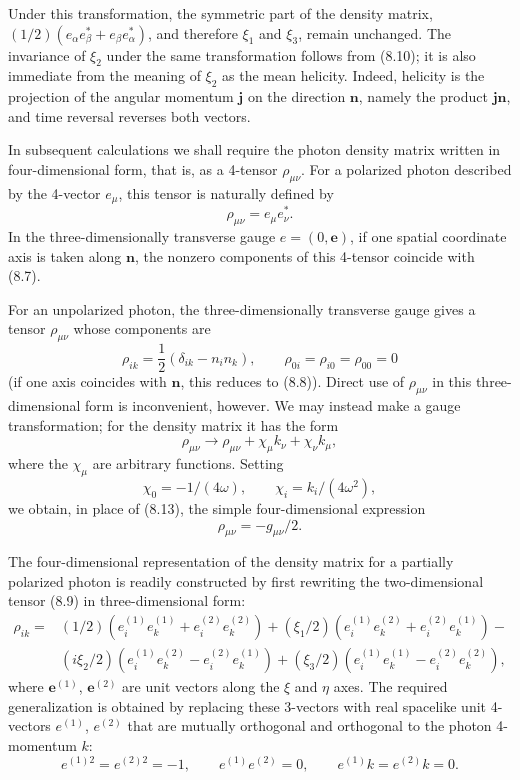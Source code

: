 Under this transformation, the symmetric part of the density matrix, $(1/2)(e_\alpha e^*_\beta+e_\beta e^*_\alpha)$, and therefore $\xi_1$ and $\xi_3$, remain unchanged. The invariance of $\xi_2$ under the same transformation follows from (8.10); it is also immediate from the meaning of $\xi_2$ as the mean helicity. Indeed, helicity is the projection of the angular momentum $\mathbf{j}$ on the direction $\mathbf{n}$, namely the product $\mathbf{j}\mathbf{n}$, and time reversal reverses both vectors.

In subsequent calculations we shall require the photon density matrix written in four-dimensional form, that is, as a 4-tensor $\rho_{\mu\nu}$. For a polarized photon described by the 4-vector $e_\mu$, this tensor is naturally defined by
\begin{equation}
\rho_{\mu\nu}=e_\mu e^*_\nu.
\tag{8.12}
\end{equation}
In the three-dimensionally transverse gauge $e=(0,\mathbf{e})$, if one spatial coordinate axis is taken along $\mathbf{n}$, the nonzero components of this 4-tensor coincide with (8.7).

For an unpolarized photon, the three-dimensionally transverse gauge gives a tensor $\rho_{\mu\nu}$ whose components are
\begin{equation}
\rho_{ik}=\frac{1}{2}(\delta_{ik}-n_i n_k),
\qquad
\rho_{0i}=\rho_{i0}=\rho_{00}=0
\tag{8.13}
\end{equation}
(if one axis coincides with $\mathbf{n}$, this reduces to (8.8)). Direct use of $\rho_{\mu\nu}$ in this three-dimensional form is inconvenient, however. We may instead make a gauge transformation; for the density matrix it has the form
\begin{equation}
\rho_{\mu\nu}\to\rho_{\mu\nu}+\chi_\mu k_\nu+\chi_\nu k_\mu,
\tag{8.14}
\end{equation}
where the $\chi_\mu$ are arbitrary functions. Setting
\[
\chi_0=-1/(4\omega),
\qquad
\chi_i=k_i/(4\omega^2),
\]
we obtain, in place of (8.13), the simple four-dimensional expression
\begin{equation}
\rho_{\mu\nu}=-g_{\mu\nu}/2.
\tag{8.15}
\end{equation}

The four-dimensional representation of the density matrix for a partially polarized photon is readily constructed by first rewriting the two-dimensional tensor (8.9) in three-dimensional form:
\[
\begin{split}
\rho_{ik}={}&(1/2)(e_i^{(1)}e_k^{(1)}+e_i^{(2)}e_k^{(2)})
+(\xi_1/2)(e_i^{(1)}e_k^{(2)}+e_i^{(2)}e_k^{(1)})-{}\\
&(i\xi_2/2)(e_i^{(1)}e_k^{(2)}-e_i^{(2)}e_k^{(1)})
+(\xi_3/2)(e_i^{(1)}e_k^{(1)}-e_i^{(2)}e_k^{(2)}),
\end{split}
\]
where $\mathbf{e}^{(1)}$, $\mathbf{e}^{(2)}$ are unit vectors along the $\xi$ and $\eta$ axes. The required generalization is obtained by replacing these 3-vectors with real spacelike unit 4-vectors $e^{(1)}$, $e^{(2)}$ that are mutually orthogonal and orthogonal to the photon 4-momentum $k$:
\begin{equation}
e^{(1)2}=e^{(2)2}=-1,
\qquad
e^{(1)}e^{(2)}=0,
\qquad
e^{(1)}k=e^{(2)}k=0.
\tag{8.16}
\end{equation}

